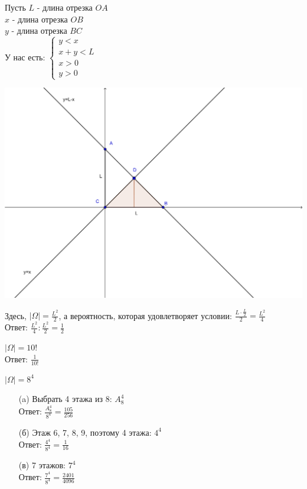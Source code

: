 \begin{exercise}[3]
	
	Пусть $L$ - длина отрезка $OA$ \\ $x$ - длина отрезка $OB$ \\ $y$ - длина отрезка $BC$ \\ У нас есть: $\begin{cases}
		y < x \\ x +y < L \\ x > 0 \\ y > 0
	\end{cases}$
	
	\includegraphics[width=\textwidth]{exercise3-2.png}	
	
	Здесь, $| \Omega | = \frac{L^2}{2}$, а вероятность, которая удовлетворяет условии: $\frac{L \cdot \frac{L}{2}}{2} = \frac{L^2}{4}$ \\ Ответ: $\frac{L^2}{4} : \frac{L^2}{2} = \frac{1}{2}$
\end{exercise}

\begin{exercise}[4]
	$| \Omega | = 10!$ \\ Ответ: $\frac{1}{10!}$
\end{exercise}

\begin{exercise}[5]
	$| \Omega | = 8^4$
	\begin{enumerate}
		\item [(a)] Выбрать 4 этажа из 8: $A^4_8$ \\ Ответ: $\frac{A^4_8}{8^4} = \frac{105}{256}$
		\item [(б)] Этаж 6, 7, 8, 9, поэтому 4 этажа: $4^4$ \\ Ответ: $\frac{4^4}{8^4} = \frac{1}{16}$
		\item [(в)] 7 этажов: $7^4$ \\ Ответ: $\frac{7^4}{8^4} = \frac{2401}{4096}$
	\end{enumerate}
\end{exercise}

